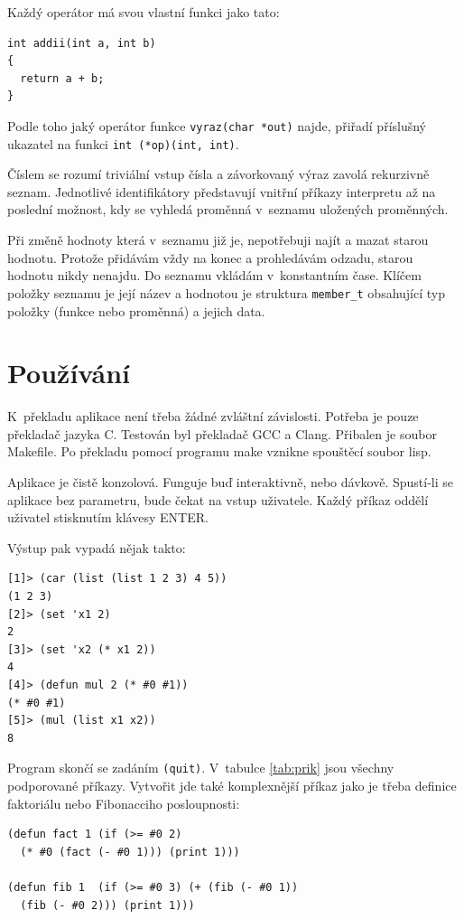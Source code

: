 \documentclass[a4paper, 12pt]{article}
\begin{document}
Každý operátor má svou vlastní funkci jako tato:
\begin{lstlisting}
int addii(int a, int b)
{
  return a + b;
}
\end{lstlisting}

Podle toho jaký operátor funkce \texttt{vyraz(char *out)} najde,
přiřadí příslušný ukazatel na funkci \verb+int (*op)(int, int)+.

Číslem se rozumí triviální vstup čísla a závorkovaný výraz zavolá
rekurzivně seznam. Jednotlivé identifikátory představují
vnitřní příkazy interpretu až na poslední možnost, kdy se vyhledá
proměnná v~seznamu uložených proměnných.

Při změně hodnoty která v~seznamu již je, nepotřebuji najít a mazat
starou hodnotu. Protože přidávám vždy na konec a prohledávám odzadu,
starou hodnotu nikdy nenajdu. Do seznamu vkládám v~konstantním čase.
Klíčem položky seznamu je její název a hodnotou je struktura
\verb+member_t+ obsahující typ položky (funkce nebo proměnná)
a jejich data.

\section{Používání}
K~překladu aplikace není třeba žádné zvláštní závislosti. Potřeba je
pouze překladač jazyka C. Testován byl překladač \textsf{GCC} a \textsf{Clang}.
Přibalen je soubor \textsf{Makefile}. Po překladu pomocí programu
\textsf{make} vznikne spouštěcí soubor \textsf{lisp}.

Aplikace je čistě konzolová. Funguje buď interaktivně, nebo
dávkově. Spustí-li se aplikace bez parametru, bude čekat na vstup
uživatele. Každý příkaz oddělí uživatel stisknutím klávesy ENTER.

Výstup pak vypadá nějak takto:
\begin{verbatim}
[1]> (car (list (list 1 2 3) 4 5))
(1 2 3)
[2]> (set 'x1 2)
2
[3]> (set 'x2 (* x1 2))
4
[4]> (defun mul 2 (* #0 #1))
(* #0 #1)
[5]> (mul (list x1 x2))
8
\end{verbatim}

Program skončí se zadáním \texttt{(quit)}. V~tabulce \ref{tab:prik}
jsou všechny podporované příkazy. Vytvořit jde také komplexnější příkaz
jako je třeba definice faktoriálu nebo Fibonacciho posloupnosti:
\begin{verbatim}
(defun fact 1 (if (>= #0 2)
  (* #0 (fact (- #0 1))) (print 1)))

(defun fib 1  (if (>= #0 3) (+ (fib (- #0 1))
  (fib (- #0 2))) (print 1)))
\end{verbatim}
\end{document}
